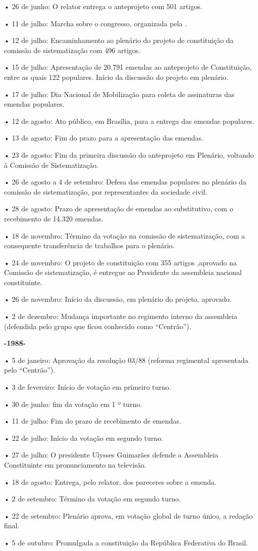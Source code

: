 • 26 de junho: O relator entrega o anteprojeto com 501 artigos.

• 11 de julho: Marcha sobre o congresso, organizada pela .

• 12 de julho: Encaminhamento ao plenário do projeto de constituição da
comissão de sistematização com 496 artigos.

• 15 de julho: Apresentação de 20.791 emendas ao anteprojeto de
Constituição, entre as quais 122 populares. Início da discussão do
projeto em plenário.

• 17 de julho: Dia Nacional de Mobilização para coleta de assinaturas
das emendas populares.

• 12 de agosto: Ato público, em Brasília, para a entrega das emendas
populares.

• 13 de agosto: Fim do prazo para a apresentação das emendas.

• 23 de agosto: Fim da primeira discussão do anteprojeto em Plenário,
voltando à Comissão de Sistematização.

• 26 de agosto a 4 de setembro: Defesa das emendas populares no plenário
da comissão de sistematização, por representantes da sociedade civil.

• 28 de agosto: Prazo de apresentação de emendas ao substitutivo, com o
recebimento de 14.320 emendas.

• 18 de novembro: Término da votação na comissão de sistematização, com
a consequente transferência de trabalhos para o plenário.

• 24 de novembro: O projeto de constituição com 355 artigos ,aprovado na
Comissão de sistematização, é entregue ao Presidente da assembleia
nacional constituinte.

• 26 de novembro: Início da discussão, em plenário do projeto, aprovado.

• 2 de dezembro: Mudança importante no regimento interno da assembleia
(defendida pelo grupo que ficou conhecido como ``Centrão'').

\textbf{-1988-}

• 5 de janeiro: Aprovação da resolução 03/88 (reforma regimental
apresentada pelo ``Centrão'').

• 3 de fevereiro: Início de votação em primeiro turno.

• 30 de junho: fim da votação em 1 º turno.

• 11 de julho: Fim do prazo de recebimento de emendas.

• 22 de julho: Início da votação em segundo turno.

• 27 de julho: O presidente Ulysses Guimarães defende a Assembleia
Constituinte em pronunciamento na televisão.

• 18 de agosto: Entrega, pelo relator, dos pareceres sobre a emenda.

• 2 de setembro: Término da votação em segundo turno.

• 22 de setembro: Plenário aprova, em votação global de turno único, a
redação final.

• 5 de outubro: Promulgada a constituição da República Federativa do
Brasil.